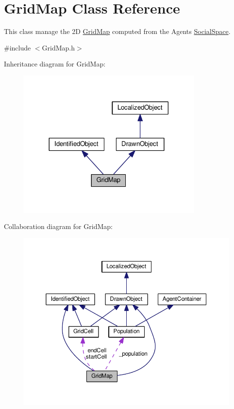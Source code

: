 \hypertarget{classGridMap}{}\section{Grid\+Map Class Reference}
\label{classGridMap}


This class manage the 2D \hyperlink{classGridMap}{Grid\+Map} computed from the Agents \hyperlink{classSocialSpace}{Social\+Space}.  




{\ttfamily \#include $<$Grid\+Map.\+h$>$}



Inheritance diagram for Grid\+Map\+:\nopagebreak
\begin{figure}[H]
\begin{center}
\leavevmode
\includegraphics[width=264pt]{classGridMap__inherit__graph}
\end{center}
\end{figure}


Collaboration diagram for Grid\+Map\+:\nopagebreak
\begin{figure}[H]
\begin{center}
\leavevmode
\includegraphics[width=350pt]{classGridMap__coll__graph}
\end{center}
\end{figure}
